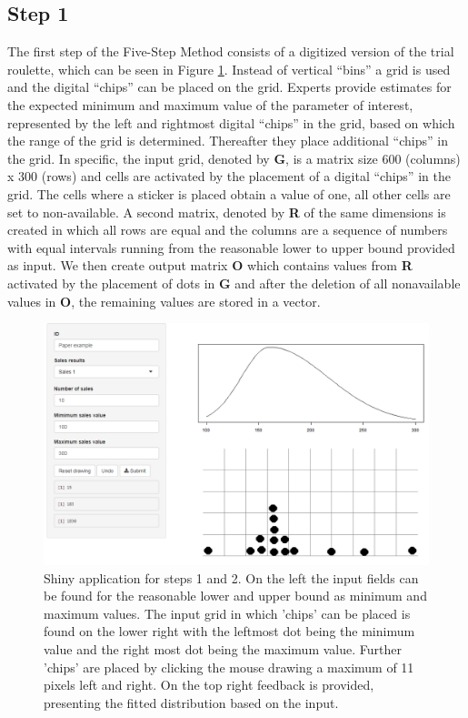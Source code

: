 \documentclass[openright,titlepage,12pt,a4paper]{book}
\begin{document}
\hypertarget{step-1}{%
\subsection{Step 1}\label{step-1}}

The first step of the Five-Step Method consists of a digitized version of the trial roulette, which can be seen in Figure \ref{fig:ch02fig1}. Instead of vertical ``bins'' a grid is used and the digital ``chips'' can be placed on the grid. Experts provide estimates for the expected minimum and maximum value of the parameter of interest, represented by the left and rightmost digital ``chips'' in the grid, based on which the range of the grid is determined. Thereafter they place additional ``chips'' in the grid. In specific, the input grid, denoted by \textbf{G}, is a matrix size 600 (columns) x 300 (rows) and cells are activated by the placement of a digital ``chips'' in the grid. The cells where a sticker is placed obtain a value of one, all other cells are set to non-available. A second matrix, denoted by \textbf{R} of the same dimensions is created in which all rows are equal and the columns are a sequence of numbers with equal intervals running from the reasonable lower to upper bound provided as input. We then create output matrix \textbf{O} which contains values from \textbf{R} activated by the placement of dots in \textbf{G} and after the deletion of all nonavailable values in \textbf{O}, the remaining values are stored in a vector.

\begin{figure}

{\centering \includegraphics[width=0.85\linewidth]{figures/chapter_2/Figure_1} 

}

\caption{Shiny application for steps 1 and 2. On the left the input fields can be found for the reasonable lower and upper bound as minimum and maximum values. The input grid in which 'chips' can be  placed is found on the lower right with the leftmost dot being the minimum value and the right most dot being the maximum value. Further 'chips' are placed by clicking the mouse drawing a maximum of 11 pixels left and right. On the top right feedback is provided, presenting the fitted distribution based on the input.}\label{fig:ch02fig1}
\end{figure}
\end{document}
